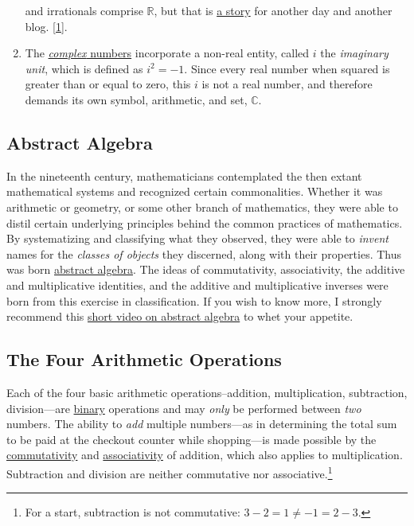 \documentclass[
  a4paper,
]{article}
\begin{document}
\begin{enumerate}
{    and irrationals comprise \(\mathbb{R}\), but that is
    \href{https://arpita95b.medium.com/cutting-through-the-confusion-how-dedekind-cuts-build-the-real-numbers-20aeaaec021d}{a
    story} for another day and another blog.}
  {[}\protect\hyperlink{ref-arpita2023}{1}{]}.
\item
  The \href{https://en.wikipedia.org/wiki/Complex_number}{\emph{complex}
  numbers} incorporate a non-real entity, called \(i\) the
  \emph{imaginary unit}, which is defined as \(i^2 = -1\). Since every
  real number when squared is greater than or equal to zero, this \(i\)
  is not a real number, and therefore demands its own symbol,
  arithmetic, and set, \(\mathbb{C}\).
\end{enumerate}

\hypertarget{abstract-algebra}{%
\subsection{Abstract Algebra}\label{abstract-algebra}}

In the nineteenth century, mathematicians contemplated the then extant
mathematical systems and recognized certain commonalities. Whether it
was arithmetic or geometry, or some other branch of mathematics, they
were able to distil certain underlying principles behind the common
practices of mathematics. By systematizing and classifying what they
observed, they were able to \emph{invent} names for the \emph{classes of
objects} they discerned, along with their properties. Thus was born
\href{https://en.wikipedia.org/wiki/Abstract_algebra}{abstract algebra}.
The ideas of commutativity, associativity, the additive and
multiplicative identities, and the additive and multiplicative inverses
were born from this exercise in classification. If you wish to know
more, I strongly recommend this
\href{https://www.youtube.com/watch?v=IP7nW_hKB7I}{short video on
abstract algebra} to whet your appetite.

\hypertarget{the-four-arithmetic-operations}{%
\subsection{The Four Arithmetic
Operations}\label{the-four-arithmetic-operations}}

Each of the four basic arithmetic operations--addition, multiplication,
subtraction, division---are
\href{https://en.wikipedia.org/w/index.php?title=Binary_operation&oldid=1182322931}{binary}
operations and may \emph{only} be performed between \emph{two} numbers.
The ability to \emph{add} multiple numbers---as in determining the total
sum to be paid at the checkout counter while shopping---is made possible
by the
\href{https://en.wikipedia.org/wiki/Commutative_property}{commutativity}
and
\href{https://en.wikipedia.org/wiki/Associative_property}{associativity}
of addition, which also applies to multiplication. Subtraction and
division are neither commutative nor associative.\footnote{For a start,
  subtraction is not commutative: \(3 - 2 = 1 \ne -1 = 2 - 3\).}
\end{document}
